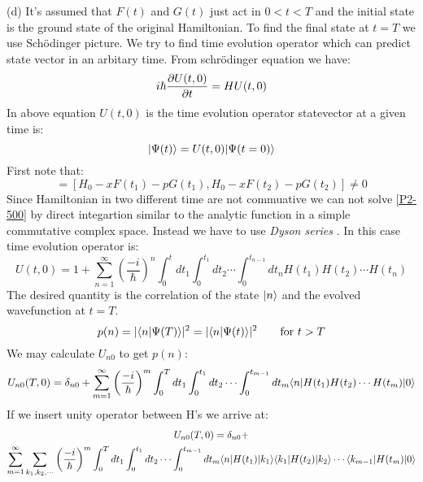 \begin{homeworkProblem}
\begin{homeworkSection}{(d)}
It's assumed that $F(t)$ and $G(t)$ just act in $0<t<T$ and the initial state is the ground state of the original Hamiltonian. To find the final state at $t=T$ we use Sch\"odinger picture. We try to find time evolution operator which can predict state vector in an arbitary time. From schr\"odinger equation we have:
\begin{equation}\label{P2-500}
i\hbar\dfrac{\partial U(t,0)}{\partial t}=HU(t,0)
\end{equation}
In above equation $U(t,0)$ is the time evolution operator statevector at a given time is:
\begin{equation}
|\Psi(t)\rangle=U(t,0)|\Psi(t=0)\rangle
\end{equation} 
First note that:
\begin{equation}
[H(t_1),H(t_2)]=[H_0-xF(t_1)-pG(t_1),H_0-xF(t_2)-pG(t_2)]\neq 0
\end{equation}
Since Hamiltonian in two different time are not commuative we can not solve \eqref{P2-500} by direct integartion similar to the analytic function in a simple commutative complex space. Instead we have to use \textit{Dyson series} \cite{sakurai}. In this case time evolution operator is:
\begin{equation}
U(t,0)=1+\sum\limits_{n=1}^{\infty}\left(\frac{-i}{\hbar}\right)^n\int_0^{t}dt_1\int_0^{t_1}dt_2\cdots\int_0^{t_{n-1}}dt_nH(t_1)H(t_2)\cdots H(t_n)
\end{equation}
The desired quantity is the correlation of the state $|n\rangle$ and the evolved wavefunction at $t=T$. 
\begin{equation}
p(n)=\lvert\langle n|\Psi(T)\rangle\rvert^2=\lvert\langle n|\Psi(t)\rangle\rvert^2\qquad\text{for $t>T$} 
\end{equation} 
We may calculate $U_{n0}$ to get $p(n)$:
\begin{equation}
U_{n0}(T,0)=\delta_{n0}+\sum\limits_{m=1}^{\infty}\left(\frac{-i}{\hbar}\right)^m\int_0^{T}dt_1\int_0^{t_1}dt_2\cdots\int_0^{t_{m-1}}dt_m\langle n|H(t_1)H(t_2)\cdots H(t_m)|0\rangle
\end{equation}
If we insert unity operator between H's we arrive at:
\begin{multline}\label{P2-bbb}
U_{n0}(T,0)=\delta_{n0}+\\
\sum\limits_{m=1}^{\infty}\sum\limits_{k_1,k_2,\cdots}\left(\frac{-i}{\hbar}\right)^m\int_0^{T}dt_1\int_0^{t_1}dt_2\cdots\int_0^{t_{m-1}}dt_m\langle n|H(t_1)|k_1\rangle\langle k_1|H(t_2)|k_2\rangle\cdots \langle k_{m-1}|H(t_m)|0\rangle
\end{multline}

\end{homeworkSection}
\end{homeworkProblem}
